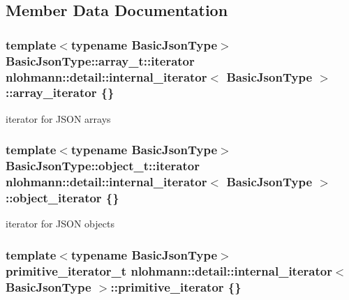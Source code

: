 \subsection{Member Data Documentation}
\subsubsection[{\texorpdfstring{array\+\_\+iterator}{array_iterator}}]{\setlength{\rightskip}{0pt plus 5cm}template$<$typename Basic\+Json\+Type$>$ Basic\+Json\+Type\+::array\+\_\+t\+::iterator {\bf nlohmann\+::detail\+::internal\+\_\+iterator}$<$ Basic\+Json\+Type $>$\+::array\+\_\+iterator \{\}}\hypertarget{structnlohmann_1_1detail_1_1internal__iterator_a8294a6e6f01b58e1cce8fbae66a50b5d}{}\label{structnlohmann_1_1detail_1_1internal__iterator_a8294a6e6f01b58e1cce8fbae66a50b5d}


iterator for J\+S\+ON arrays 

\subsubsection[{\texorpdfstring{object\+\_\+iterator}{object_iterator}}]{\setlength{\rightskip}{0pt plus 5cm}template$<$typename Basic\+Json\+Type$>$ Basic\+Json\+Type\+::object\+\_\+t\+::iterator {\bf nlohmann\+::detail\+::internal\+\_\+iterator}$<$ Basic\+Json\+Type $>$\+::object\+\_\+iterator \{\}}\hypertarget{structnlohmann_1_1detail_1_1internal__iterator_a8cb0af3498061426c1d0a65ad6220408}{}\label{structnlohmann_1_1detail_1_1internal__iterator_a8cb0af3498061426c1d0a65ad6220408}


iterator for J\+S\+ON objects 

\subsubsection[{\texorpdfstring{primitive\+\_\+iterator}{primitive_iterator}}]{\setlength{\rightskip}{0pt plus 5cm}template$<$typename Basic\+Json\+Type$>$ {\bf primitive\+\_\+iterator\+\_\+t} {\bf nlohmann\+::detail\+::internal\+\_\+iterator}$<$ Basic\+Json\+Type $>$\+::primitive\+\_\+iterator \{\}}\hypertarget{structnlohmann_1_1detail_1_1internal__iterator_a2b3bb45f968210e42c282017eeeb63a8}{}\label{structnlohmann_1_1detail_1_1internal__iterator_a2b3bb45f968210e42c282017eeeb63a8}


